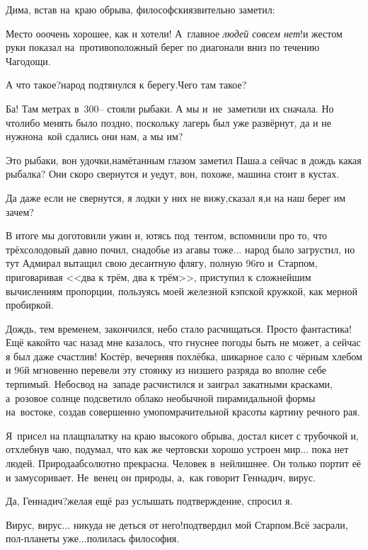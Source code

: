 Дима, встав на~краю обрыва, философски\sdash язвительно заметил: 

\diagdash Место о\sdash о\sdash очень хорошее, как и хотели! А~главное \textit{людей совсем нет}!\mdash и жестом руки показал на~противоположный берег по диагонали вниз по течению Чагодощи. 

\diagdash А что такое?\mdash народ подтянулся к берегу.\mdash Чего там такое?

Ба! Там метрах в~300\thinspace\nobreakdash-- стояли рыбаки. А мы и~не~заметили их сначала. Но что\sdash либо менять было поздно, поскольку лагерь был уже развёрнут, да и не нужно\mdash на~кой сдались они нам, а мы им?

\diagdash Это рыбаки, вон удочки,\mdash намётанным глазом заметил Паша.\mdash а сейчас в дождь какая рыбалка? Они скоро свернутся и уедут, вон, похоже, машина стоит в кустах.

\diagdash Да даже если не свернутся, я лодки у них не вижу,\mdash сказал я,\mdash и на наш берег им зачем?

В итоге мы доготовили ужин и, ютясь под~тентом, вспомнили про то, что трёхсолодовый давно почил, снадобье из агавы тоже$\ldots$ народ было загрустил, но тут Адмирал вытащил свою десантную флягу, полную 96\sdash го и~Старпом, приговаривая <<два к трём, два к трём>>, приступил к сложнейшим вычислениям пропорции, пользуясь моей железной кэпской кружкой, как мерной пробиркой. 

Дождь, тем временем, закончился, небо стало расчищаться. Просто фантастика! Ещё какой\sdash то час назад мне казалось, что гнуснее погоды быть не может, а сейчас я был даже счастлив! Костёр, вечерняя похлёбка, шикарное сало с чёрным хлебом и 96\sdash й мгновенно перевели эту стоянку из низшего разряда во вполне себе терпимый. Небосвод на~западе расчистился и заиграл закатными красками, а~розовое солнце подсветило облако необычной пирамидальной формы на~востоке, создав совершенно умопомрачительной красоты картину речного рая. 

Я~присел на плащ\sdash палатку на краю высокого обрыва, достал кисет с трубочкой и, отхлебнув чаю, подумал, что как же чертовски хорошо устроен мир$\ldots$ пока нет людей. Природа\mdash абсолютно прекрасна. Человек в~ней\mdash лишнее. Он только портит её и замусоривает. Не~венец он природы, а,~как говорит Геннадич, вирус.

\diagdash Да, Геннадич?\mdash желая ещё раз услышать подтверждение, спросил я.

\diagdash Вирус, вирус$\ldots$ никуда не деться от него!\mdash подтвердил мой Старпом.\mdash Всё засрали, пол-планеты уже$\ldots$\mdash полилась философия.

